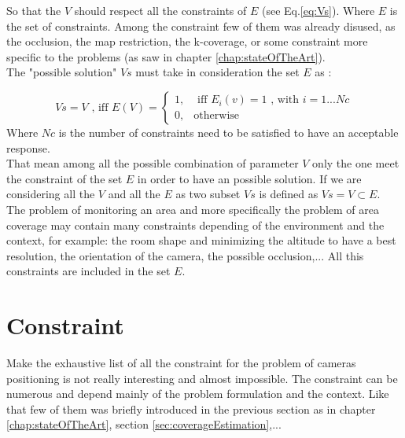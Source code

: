So that the $V$ should respect all the constraints of $E$ (see Eq.\ref{eq:Vs}). Where $E$ is the set of constraints. Among the constraint few of them was already disused, as the occlusion, the map restriction, the k-coverage, or some constraint more specific to the problems (as saw in chapter \ref{chap:stateOfTheArt}).\\
 The "possible solution" $Vs$ must take in consideration the set $E$ as :

\begin{equation}\label{eq:Vs}
Vs=V \mbox{ , iff } E(V)=\begin{cases}1, & \mbox{  iff } E_i(v)=1 \mbox{ , with } i=1...Nc \\ 0, & \mbox{otherwise} 
\end{cases} 
\end{equation}
Where $Nc$ is the number of constraints need to be satisfied to have an acceptable response.\\
That mean among all the possible combination of parameter $V$ only the one meet the constraint of the set $E$ in order to have an possible solution.  If we are considering  all the $V$ and all the $E$ as two subset $Vs$ is defined as $Vs=V\subset E$.\\ 

The problem of monitoring an area and more specifically the problem of area coverage may contain many constraints depending of the environment and the context, for example: the room shape and minimizing the altitude to have a best resolution, the orientation of the camera, the possible occlusion,... All this constraints are included in the set $E$. \\

\section{Constraint}\label{sec:constraint}

Make the exhaustive list of all the constraint for the problem of cameras positioning is not really interesting and almost impossible. The constraint can be numerous and depend mainly of the problem formulation and the context. Like that few of them was briefly introduced in the previous section as in chapter \ref{chap:stateOfTheArt}, section \ref{sec:coverageEstimation},...\\

